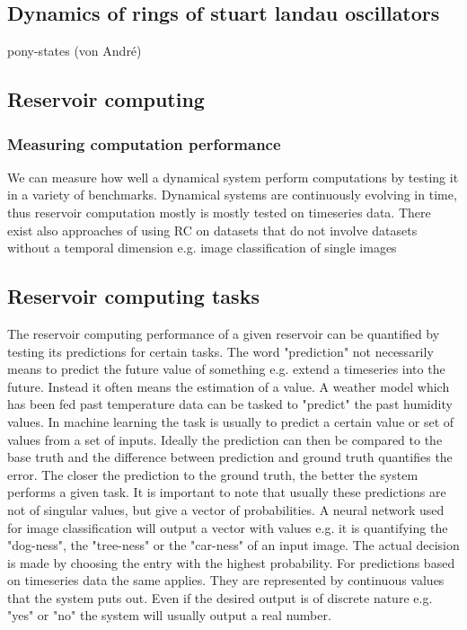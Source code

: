 	

\subsection{Dynamics of rings of stuart landau oscillators}
	pony-states (von André)
	
\subsection{Reservoir computing}
	
	\subsubsection{Measuring computation performance}
	We can measure how well a dynamical system perform computations by testing it in a variety of benchmarks. Dynamical systems are continuously evolving in time, thus reservoir computation mostly is mostly tested on timeseries data. There exist also approaches of using RC on datasets that do not involve datasets without a temporal dimension e.g. image classification of single images \cite{}
	
	
	
	
\subsection{Reservoir computing tasks}
	
	The reservoir computing performance of a given reservoir can be quantified by testing its predictions for certain tasks. The word "prediction" not necessarily means to predict the future value of something e.g. extend a timeseries into the future. Instead it often means the estimation of a value. A weather model which has been fed past temperature data can be tasked to "predict" the past humidity values. In machine learning the task is usually to predict a certain value or set of values from a set of inputs. Ideally the prediction can then be compared to the base truth and the difference between prediction and ground truth quantifies the error. The closer the prediction to the ground truth, the better the system performs a given task. 
	It is important to note that usually these predictions are not of singular values, but give a vector of probabilities. A neural network used for image classification will output a vector with values e.g. it is quantifying the "dog-ness", the "tree-ness" or the "car-ness" of an input image. The actual decision is made by choosing the entry with the highest probability. 
	For predictions based on timeseries data the same applies. They are represented by continuous values that the system puts out. Even if the desired output is of discrete nature e.g. "yes" or "no" the system will usually output a real number. 
	
